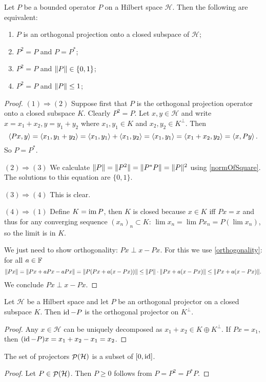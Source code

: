 \begin{proposition}
Let $P$ be a bounded operator $P$ on a Hilbert space $\mathcal{H}$. Then the following are equivalent:
\begin{enumerate}
\item $P$ is an orthogonal projection onto a closed subspace of $\mathcal{H}$;
\item $P^2 = P$ and $P=P^*$;
\item $P^2 = P$ and $\lVert P\rVert\in \{0,1\}$;
\item $P^2 = P$ and $\lVert P\rVert\leq 1$;
\end{enumerate}
\end{proposition}
\begin{proof}
$\boxed{(1)\Rightarrow (2)}$  Suppose first that $P$ is the orthogonal projection operator onto a closed subspace $K$. Clearly $P^2 = P$. Let $x,y\in\mathcal{H}$ and write $x= x_1+x_2, y = y_1+y_2$ where $x_1,y_1\in K$ and $x_2,y_2\in K^\perp$. Then
\[ \left\langle Px, y \right\rangle = \left\langle x_1, y_1+y_2 \right\rangle = \left\langle x_1, y_1 \right\rangle + \left\langle x_1,y_2 \right\rangle = \left\langle x_1,y_1 \right\rangle = \left\langle x_1+x_2, y_2 \right\rangle = \left\langle x,Py \right\rangle. \]
So $P = P^*$.

$\boxed{(2)\Rightarrow (3)}$ We calculate $\lVert P\rVert = \lVert P^2\rVert = \lVert P^*P\rVert = \lVert P\rVert^2$ using \ref{normOfSquare}. The solutions to this equation are $\{0,1\}$.

$\boxed{(3)\Rightarrow (4)}$ This is clear.

$\boxed{(4)\Rightarrow (1)}$ Define $K=\operatorname{im} P$, then $K$ is closed because $x\in K$ iff $Px=x$ and thus for any converging sequence $(x_n)_n\subset K$: $\lim x_n = \lim Px_n = P\left(\lim x_n\right)$, so the limit is in $K$.

We just need to show orthogonality: $Px \perp x- Px$. For this we use \ref{orthogonality}: for all $a\in\mathbb{F}$
\[ \lVert Px\rVert = \lVert Px + aPx - aPx\rVert = \lVert P(Px + a(x-Px))\rVert \leq \lVert P\rVert\cdot \lVert Px + a(x-Px)\rVert \leq \lVert Px + a(x-Px)\rVert. \]
We conclude $Px \perp x- Px$.
\end{proof}

\begin{proposition} \label{projectorOrthogonalComplement}
Let $\mathcal{H}$ be a Hilbert space and let $P$ be an orthogonal projector on a closed subspace $K$. Then $\operatorname{id}-P$ is the orthogonal projector on $K^\perp$.
\end{proposition}
\begin{proof}
Any $x\in \mathcal{H}$ can be uniquely decomposed as $x_1 + x_2\in K\oplus K^\perp$. If $Px = x_1$, then $(\operatorname{id} - P)x = x_1 +x_2 - x_1 = x_2$.
\end{proof}
\begin{corollary} \label{projectorsIn01}
The set of projectors $\mathop{\mathcal{P}}\nolimits(\mathcal{H})$ is a subset of $[0,\operatorname{id}]$.
\end{corollary}
\begin{proof}
Let $P\in\mathop{\mathcal{P}}\nolimits(\mathcal{H})$. Then $P\geq 0$ follows from $P = P^2 = P^*P$.
\end{proof}

